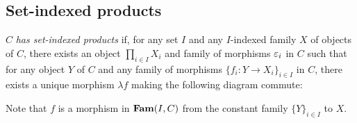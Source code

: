 \subsection{Set-indexed products}

$C$ \emph{has set-indexed products} if, for any set $I$ and any $I$-indexed family $X$ of objects of $C$,
there exists an object $\prod_{i \in I}X_i$ and family of morphisms $\varepsilon_i$ in $C$ such that for any object
$Y$ of $C$ and any family of morphisms $\{f_i: Y \to X_i\}_{i \in I}$ in $C$, there exists a unique morphism
$\lambda f$ making the following diagram commute:

\begin{center}
\end{center}

Note that $f$ is a morphism in $\mathbf{Fam}(I,C)$ from the constant family $\{Y\}_{i \in I}$ to $X$.
